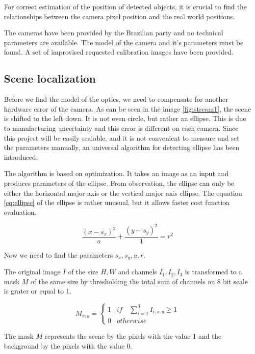 \documentclass[a4paper,12pt,titlepage]{article}
\numberwithin{figure}{section}
\begin{document}
For correct estimation of the position of detected objects, it is crucial to find the relationships between the camera pixel position and the real world positions. 

The cameras have been provided by the Brazilian party and no technical parameters are available. The model of the camera and it's parameters must be found. A set of improvised requested calibration images have been provided.

\subsection{Scene localization}
\label{sec:scene_localization}
Before we find the model of the optics, we need to compensate for another hardware error of the camera. As can be seen in the image \ref{fig:stream1}, the scene is shifted to the left down. It is not even circle, but rather an ellipse. This is due to manufacturing uncertainty and this error is different on each camera. Since this project will be easily scalable, and it is not convenient to measure and set the parameters manually, an universal algorithm for detecting ellipse has been introduced.

The algorithm is based on optimization. It takes an image as an input and produces parameters of the ellipse. From observation, the ellipse can only be either the horizontal major axis or the vertical major axis ellipse. The equation \ref{eq:ellipse} of the ellipse is rather unusual, but it allows faster cost function evaluation.

\begin{equation}
\label{eq:ellipse}
\frac{(x-s_x)^2}{a} + \frac{(y-s_y)^2}{1} = r^2
\end{equation}

Now we need to find the parameters $s_x, s_y, a, r$.

The original image $I$ of the size $H, W$ and channels $I_1, I_2, I_3$ is transformed to a mask $M$ of the same size by thresholding the total sum of channels on 8 bit scale is grater or equal to 1. \cite{lukacs1997real}

\begin{equation*}
M_{x,y} = \begin{cases}
1 & if \quad \sum_{i=1}^{3} I_{i,x,y} \geq 1 \\
0 & otherwise
\end{cases}
\end{equation*}

The mask $M$ represents the scene by the pixels with the value 1 and the background by the pixels with the value 0. 
\end{document}
